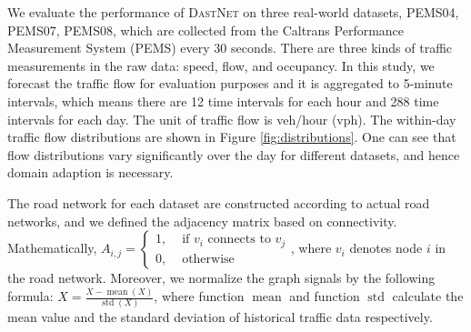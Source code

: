 \documentclass[sigconf]{acmart}
\theoremstyle{definition}
\begin{document}
We evaluate the performance of \textsc{DastNet} on three real-world datasets, PEMS04, PEMS07, PEMS08, which are collected from the Caltrans Performance Measurement System (PEMS) \cite{caltrans} every 30 seconds. There are three kinds of traffic measurements in the raw data: speed, flow, and occupancy. In this study, we forecast the traffic flow for evaluation purposes and it is aggregated to 5-minute intervals, which means there are 12 time intervals for each hour and 288 time intervals for each day. The unit of traffic flow is veh/hour (vph).
The within-day traffic flow distributions are shown in Figure \ref{fig:distributions}. One can see that flow distributions vary significantly over the day for different datasets, and hence domain adaption is necessary.


The road network for each dataset are constructed according to actual road networks, and we defined the adjacency matrix based on connectivity. Mathematically, $A_{i, j} = \begin{cases}1, & \text { if } v_{i} \text { connects to } v_{j} \\ 0, & \text { otherwise }\end{cases}$, where $v_i$ denotes node $i$ in the road network. Moreover, we normalize the graph signals by the following formula: ${X}=\frac{{X}-\operatorname{mean}({X})}{\operatorname{std}({X})}$, where function $\operatorname{mean}$ and function $\operatorname{std}$ calculate the mean value and the standard deviation of historical traffic data respectively.
\end{document}
